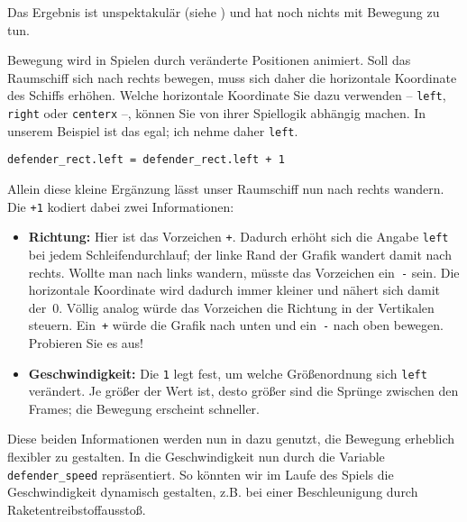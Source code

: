 
Das Ergebnis ist unspektakulär (siehe ) und hat noch nichts mit Bewegung zu tun.

Bewegung wird in Spielen durch veränderte Positionen animiert. Soll das Raumschiff sich nach rechts bewegen, muss sich daher die horizontale Koordinate des Schiffs erhöhen. Welche horizontale Koordinate Sie dazu verwenden -- \texttt{left}, \texttt{right} oder \texttt{centerx} --, können Sie von ihrer Spiellogik abhängig machen. In unserem Beispiel ist das egal; ich nehme daher \texttt{left}.

\lstset{firstnumber=38}
\begin{lstlisting}
defender_rect.left = defender_rect.left + 1
\end{lstlisting}

Allein diese kleine Ergänzung lässt unser Raumschiff nun nach rechts wandern. Die \texttt{+1} kodiert dabei zwei Informationen: 
\begin{itemize}
	\item \textbf{Richtung:} Hier ist das Vorzeichen \texttt{+}. Dadurch erhöht sich die Angabe \texttt{left} bei jedem Schleifendurchlauf; der linke Rand der Grafik wandert damit nach rechts. Wollte man nach links wandern, müsste das Vorzeichen ein~\texttt{-} sein. Die horizontale Koordinate wird dadurch immer kleiner und nähert sich damit der~0. Völlig analog würde das Vorzeichen die Richtung in der Vertikalen steuern. Ein~\texttt{+} würde die Grafik nach unten und ein~\texttt{-} nach oben bewegen. Probieren Sie es aus!
	
	\item \textbf{Geschwindigkeit:} Die \texttt{1} legt fest, um welche Größenordnung sich \texttt{left} verändert. Je größer der Wert ist, desto größer sind die Sprünge zwischen den Frames; die Bewegung erscheint schneller. 
\end{itemize}


Diese beiden Informationen werden nun in  dazu genutzt, die Bewegung erheblich flexibler zu gestalten. In  die Geschwindigkeit nun durch die Variable \texttt{defender\_speed} repräsentiert. So könnten wir im Laufe des Spiels die Geschwindigkeit dynamisch gestalten, z.B. bei einer Beschleunigung durch Raketentreibstoffausstoß. 

